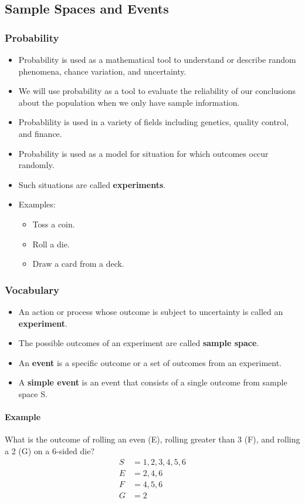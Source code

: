 \subsection{Sample Spaces and Events}
\hrulefill

\subsubsection{Probability}
\begin{itemize}
    \item Probability is used as a mathematical tool to understand or describe random phenomena, chance variation, and uncertainty. 
    \item We will use probability as a tool to evaluate the reliability of our conclusions about the population when we only have sample information.
    \item Probablility is used in a variety of fields including genetics, quality control, and finance.
    \item Probability is used as a model for situation for which outcomes occur randomly.
    \item Such situations are called \textbf{experiments}.
    \item Examples:
    \begin{itemize}
        \item Toss a coin.
        \item Roll a die.
        \item Draw a card from a deck.
    \end{itemize}
\end{itemize}

\subsubsection*{Vocabulary}
\begin{itemize}
    \item An action or process whose outcome is subject to uncertainty is called an \textbf{experiment}.
    \item The possible outcomes of an experiment are called \textbf{sample space}.
    \item An \textbf{event} is a specific outcome or a set of outcomes from an experiment.
    \item A \textbf{simple event} is an event that consists of a single outcome from sample space S.
\end{itemize}

\paragraph*{Example} What is the outcome of rolling an even (E), rolling greater than 3 (F), and rolling a 2 (G) on a 6-sided die?
\begin{align*}
    S &= {1, 2, 3, 4, 5, 6}\\
    E &= {2, 4, 6}\\
    F &= {4, 5, 6}\\
    G &= {2}
\end{align*}

